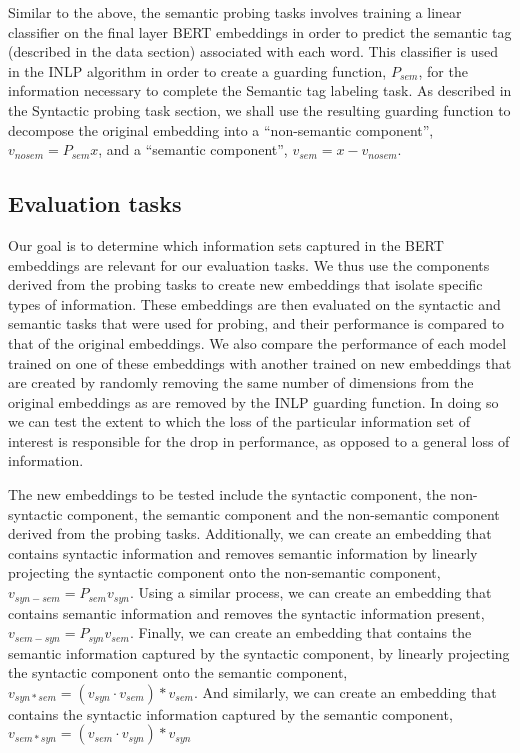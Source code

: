 \documentclass[11pt,a4paper]{article}
\begin{document}
Similar to the above, the semantic probing tasks involves training a linear classifier on the final layer BERT embeddings in order to predict the semantic tag (described in the data section) associated with each word. This classifier is used in the INLP algorithm in order to create a guarding function, $P_{sem}$, for the information necessary to complete the Semantic tag labeling task. As described in the Syntactic probing task section, we shall use the resulting guarding function to decompose the original embedding into a ``non-semantic component'', $v_{no sem} = P_{sem} x$, and a ``semantic component'', $v_{sem} = x - v_{no sem}$. 


\subsection{Evaluation tasks}
\label{sec:eval}

Our goal is to determine which information sets captured in the BERT embeddings are relevant for our evaluation tasks. We thus use the components derived from the probing tasks to create new embeddings that isolate specific types of information. These embeddings are then evaluated on the syntactic and semantic tasks that were used for probing, and their performance is compared to that of the original embeddings. We also compare the performance of each model trained on one of these embeddings with another trained on new embeddings that are created by randomly removing the same number of dimensions from the original embeddings as are removed by the INLP guarding function. In doing so we can test the extent to which the loss of the particular information set of interest is responsible for the drop in performance, as opposed to a general loss of information. 

The new embeddings to be tested include the syntactic component, the non-syntactic component, the semantic component and the non-semantic component derived from the probing tasks. Additionally, we can create an embedding that contains syntactic information and removes semantic information by linearly projecting the syntactic component onto the non-semantic component, $v_{syn - sem} = P_{sem} v_{syn}$. Using a similar process, we can create an embedding that contains semantic information and removes the syntactic information present, $v_{sem - syn} = P_{syn} v_{sem}$. Finally, we can create an embedding that contains the semantic information captured by the syntactic component, by linearly projecting the syntactic component onto the semantic component, $v_{syn * sem} = (v_{syn} \cdot v_{sem}) * v_{sem}$. And similarly, we can create an embedding that contains the syntactic information captured by the semantic component, $v_{sem * syn} = (v_{sem} \cdot v_{syn}) * v_{syn}$
\end{document}
